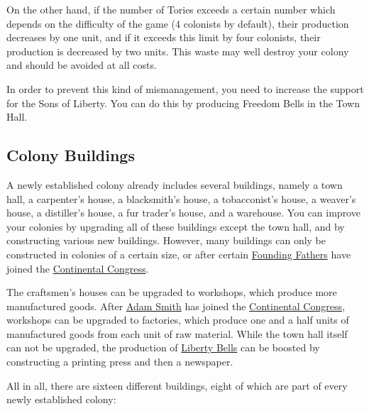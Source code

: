 \documentclass[12pt]{article}
\begin{document}
On the other hand, if the number of Tories exceeds a certain number
which depends on the difficulty of the game (4 colonists by default),
their production decreases by one unit, and if it exceeds this limit
by four colonists, their production is decreased by two units. This
waste may well destroy your colony and should be avoided at all
costs.

In order to prevent this kind of mismanagement, you need to increase
the support for the Sons of Liberty. You can do this by producing
Freedom Bells in the Town Hall.


\hypertarget{Colony Buildings}{\subsection{Colony Buildings}}

A newly established colony already includes several buildings, namely
a town hall, a carpenter's house, a blacksmith's house, a
tobacconist's house, a weaver's house, a distiller's house, a fur
trader's house, and a warehouse. You can improve your colonies by
upgrading all of these buildings except the town hall, and by
constructing various new buildings. However, many buildings can only
be constructed in colonies of a certain size, or after certain
\hyperlink{Founding Fathers}{Founding Fathers} have joined the
\hyperlink{Continental Congress}{Continental Congress}.

The craftsmen's houses can be upgraded to workshops, which produce
more manufactured goods. After \hyperlink{Adam Smith}{Adam Smith} has
joined the \hyperlink{Continental Congress}{Continental Congress},
workshops can be upgraded to factories, which produce one and a half
units of manufactured goods from each unit of raw material. While the
town hall itself can not be upgraded, the production of
\hyperlink{Liberty Bells}{Liberty Bells} can be boosted by
constructing a printing press and then a newspaper.

All in all, there are sixteen different buildings, eight of which are
part of every newly established colony:
\end{document}
